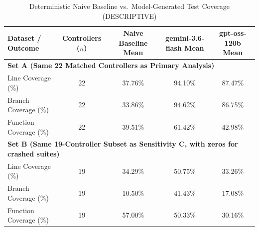 \begin{table}[htbp]
\centering
\caption{Deterministic Naive Baseline vs.\ Model-Generated Test Coverage (DESCRIPTIVE)}
\label{tab:naive_baseline}
\begin{tabular}{lcccc}
\toprule
\textbf{Dataset / Outcome} & \textbf{Controllers ($n$)} & \textbf{Naive Baseline Mean} & \textbf{gemini-3.6-flash Mean} & \textbf{gpt-oss-120b Mean} \\
\midrule
\multicolumn{5}{l}{\textbf{Set A (Same 22 Matched Controllers as Primary Analysis)}} \\
\midrule
Line Coverage (\%) & 22 & 37.76\% & 94.10\% & 87.47\% \\
Branch Coverage (\%) & 22 & 33.86\% & 94.62\% & 86.75\% \\
Function Coverage (\%) & 22 & 39.51\% & 61.42\% & 42.98\% \\
\midrule
\multicolumn{5}{l}{\textbf{Set B (Same 19-Controller Subset as Sensitivity C, with zeros for crashed suites)}} \\
\midrule
Line Coverage (\%) & 19 & 34.29\% & 50.75\% & 33.26\% \\
Branch Coverage (\%) & 19 & 10.50\% & 41.43\% & 17.08\% \\
Function Coverage (\%) & 19 & 57.00\% & 50.33\% & 30.16\% \\
\bottomrule
\end{tabular}
\end{table}
